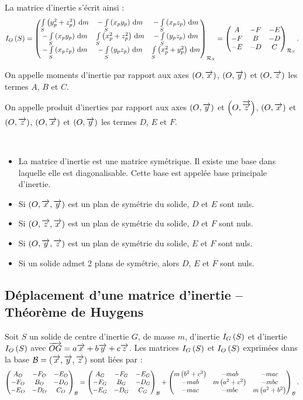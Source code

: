 \documentclass[10pt,fleqn]{article} %
\begin{document}
\begin{defi}
La matrice d'inertie s'écrit ainsi : 
$$
\inertie{O}{S}=\matinertie{\int\limits_{S} \left(y_p^2 + z_p^2 \right)\,\dd m}{\int\limits_{S} \left(x_p^2 + z_p^2 \right)\,\dd m}{\int\limits_{S} \left(x_p^2 + y_p^2 \right)\,\dd m}{-\int\limits_{S} \left(y_pz_p\right)\,\dd m}{-\int\limits_{S} \left(x_pz_p\right)\,\dd m}{-\int\limits_{S} \left(x_py_p\right)\,\dd m}{\mathcal{R}_S}=\matinertie{A}{B}{C}{-D}{-E}{-F}{\mathcal{R}_S}
.$$

On appelle moments d'inertie par rapport aux axes $\axe{O}{{x}}$, $\axe{O}{{y}}$ et $\axe{O}{{z}}$  les termes $A$, $B$ et $C$. 

On appelle produit d'inerties par rapport aux axes $\axe{O}{{y}}$ et $\axe{O}{\vect{z}}$,  $\axe{O}{{x}}$ et $\axe{O}{{z}}$,  $\axe{O}{{x}}$ et $\axe{O}{{y}}$ les termes $D$, $E$ et $F$.
\end{defi}

\begin{prop}~\\

\begin{itemize}[label=,font=\color{ocre}] 
\item La matrice d'inertie est une matrice symétrique. Il existe une base dans laquelle elle est diagonalisable. Cette base est appelée base principale d'inertie. 
\item Si $\left(O,\vect{x},\vect{y} \right)$ est un plan de symétrie du solide, $D$ et $E$ sont nuls.
\item Si $\left(O,\vect{z},\vect{x} \right)$ est un plan de symétrie du solide, $D$ et $F$ sont nuls.
\item Si $\left(O,\vect{y},\vect{z} \right)$ est un plan de symétrie du solide, $E$ et $F$ sont nuls.
\item Si un solide admet 2 plans de symétrie, alors $D$, $E$ et $F$ sont nuls. 
\end{itemize}

\end{prop}
\subsection[Déplacement d'une matrice d'inertie]{Déplacement d'une matrice d'inertie -- Théorème de Huygens}

\begin{theorem}
Soit $S$ un solide de centre d'inertie $G$, de masse $m$, d'inertie $\inertie{G}{S}$ et d'inertie $\inertie{O}{S}$ avec $\vect{OG}=a\vect{x}+b\vect{y}+c\vect{z}$. Les matrices $\inertie{G}{S}$ et $\inertie{O}{S}$ exprimées dans la base $\mathcal{B}=\base{x}{y}{z}$ sont liées par : 
$$
\matinertie{A_O}{B_O}{C_O}{-D_O}{-E_O}{-F_O}{\mathcal{B}}
= \matinertie{A_G}{B_G}{C_G}{-D_G}{-E_G}{-F_G}{\mathcal{B}}
+ \matinertie{m\left(b^2+c^2\right)}{m\left(a^2+c^2\right)}{m\left(a^2+b^2\right)}{-mbc}{-mac}{-mab}{\mathcal{B}}.
$$

\end{theorem}
\end{document}
